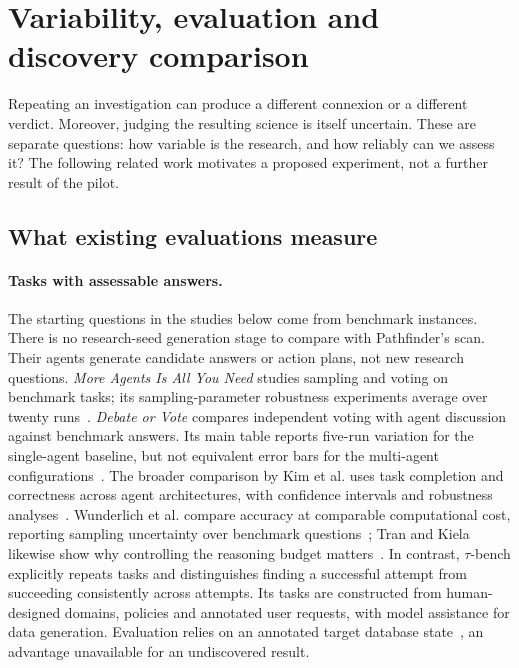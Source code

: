 \documentclass[11pt,a4paper]{article}
\begin{document}
\section{Variability, evaluation and discovery comparison}
\label{app:discovery-recovery}

Repeating an investigation can produce a different connexion or a different
verdict. Moreover, judging the resulting science is
itself uncertain. These are separate questions: how variable is the research,
and how reliably can we assess it? The following related work motivates a
proposed experiment, not a further result of the pilot.

\subsection{What existing evaluations measure}

\paragraph{Tasks with assessable answers.}
The starting questions in the studies below come from benchmark instances. There
is no research-seed generation stage to compare with Pathfinder's scan. Their
agents generate candidate answers or action plans, not new research questions.
\emph{More Agents Is All You Need} studies sampling and voting on benchmark
tasks; its sampling-parameter robustness experiments average over twenty
runs~\cite{li2024more}. \emph{Debate or Vote} compares independent voting with
agent discussion against benchmark answers. Its main table reports five-run
variation for the single-agent baseline, but not equivalent error bars for the
multi-agent configurations~\cite{choi2025debate}. The broader comparison by Kim
et al. uses task completion and correctness across agent architectures, with
confidence intervals and robustness analyses~\cite{kim2026scaling}. Wunderlich
et al. compare accuracy at comparable computational cost, reporting sampling
uncertainty over benchmark questions~\cite{wunderlich2026compute}; Tran and
Kiela likewise show why controlling the reasoning budget
matters~\cite{tran2026single}. In contrast, $\tau$-bench explicitly repeats
tasks and distinguishes finding a successful attempt from succeeding
consistently across attempts. Its tasks are constructed from human-designed
domains, policies and annotated user requests, with model assistance for data
generation. Evaluation relies on an annotated target database
state~\cite{yao2024tau}, an advantage unavailable for an undiscovered result.
\end{document}

